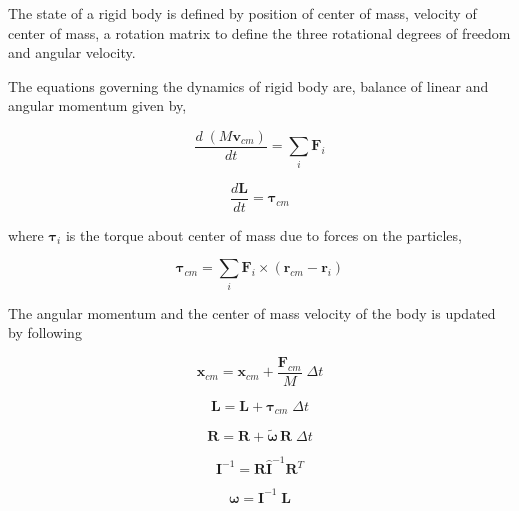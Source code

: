 \documentclass[preprint,12pt]{elsarticle}
\newcommand{\teng}[1]{\ensuremath{\boldsymbol{#1}}}
\newcommand{\ten}[1]{\ensuremath{\mathbf{#1}}}
\begin{document}

The state of a rigid body is defined by position of center of mass, velocity
of center of mass, a rotation matrix to define the three rotational degrees of
freedom and angular velocity.

The equations governing the dynamics of rigid body are, balance of linear and
angular momentum given by,

\begin{equation}
  \label{eq:balance_linear_mom}
  \frac{d \; (M \ten{v}_{cm})}{d t} = \sum_i \ten{F}_i
\end{equation}

\begin{equation}
  \label{eq:balance_angular_mom}
  \frac{d \ten{L}}{d t} = \teng{\tau}_{cm}
\end{equation}

where $\teng{\tau}_i$ is the torque about center of mass due to forces on the
particles,

\begin{equation}
  \label{eq:torque}
  \teng{\tau}_{cm} = \sum_i \ten{F}_i \times (\ten{r}_{cm} - \ten{r}_{i})
\end{equation}

The angular momentum and the center of mass velocity of the body is updated by following

\begin{equation}
  \label{eq:ang_mom_update}
  \ten{x}_{cm} = \ten{x}_{cm} + \frac{\ten{F}_{cm}}{M} \; \Delta t
\end{equation}


\begin{equation}
  \label{eq:ang_mom_update}
  \ten{L} = \ten{L} + \teng{\tau}_{cm} \; \Delta t
\end{equation}


\begin{equation}
  \label{eq:rotation_update}
  \ten{R} = \ten{R} + \tilde{\teng{\omega}} \, \ten{R} \; \Delta t
\end{equation}


\begin{equation}
  \label{eq:moi_update}
  \ten{I}^{-1} = \ten{R} \hat{\ten{I}}^{-1} \ten{R}^T
\end{equation}


\begin{equation}
  \label{eq:moi_update}
  \teng{\omega} = \ten{I}^{-1} \; \ten{L}
\end{equation}
\end{document}

